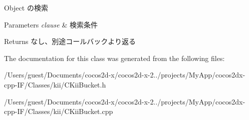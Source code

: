 Object の検索 


\begin{DoxyParams}{Parameters}
{\em clause} & 検索条件 \\
\hline
\end{DoxyParams}
\begin{DoxyReturn}{Returns}
なし、別途コールバックより返る 
\end{DoxyReturn}


The documentation for this class was generated from the following files\-:\begin{DoxyCompactItemize}
\item 
/\-Users/guest/\-Documents/cocos2d-\/x/cocos2d-\/x-\/2../projects/\-My\-App/cocos2dx-\/cpp-\/\-I\-F/\-Classes/kii/C\-Kii\-Bucket.\-h\item 
/\-Users/guest/\-Documents/cocos2d-\/x/cocos2d-\/x-\/2../projects/\-My\-App/cocos2dx-\/cpp-\/\-I\-F/\-Classes/kii/C\-Kii\-Bucket.\-cpp\end{DoxyCompactItemize}
